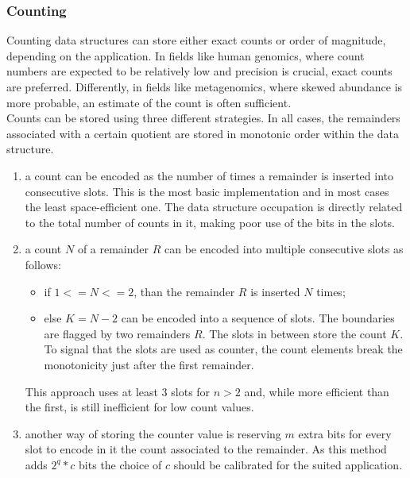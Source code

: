 \subsubsection*{Counting}
\label{sec:rsqfcount}
Counting data structures can store either exact counts or order of magnitude, depending on the application. In fields like human genomics, where count numbers are expected to be relatively low and precision is crucial, exact counts are preferred. Differently, in fields like metagenomics, where skewed abundance is more probable, an estimate of the count is often sufficient.\\
Counts can be stored using three different strategies. In all cases, the remainders associated with a certain quotient are stored in monotonic order within the data structure.
\begin{enumerate}
	\item  a count can be encoded as the number of times a remainder is inserted into consecutive slots. This is the most basic implementation and in most cases the least space-efficient one. The data structure occupation is directly related to the total number of counts in it, making poor use of the bits in the slots.
	\item a count $N$ of a remainder $R$ can be encoded into multiple consecutive slots as follows: 
	\begin{itemize}
		\item if $1 <= N <= 2$, than the remainder $R$ is inserted $N$ times;
		\item else $K = N - 2$ can be encoded into a sequence of slots. The boundaries are flagged by two remainders $R$. The slots in between store the count $K$. To signal that the slots are used as counter, the count elements break the monotonicity just after the first remainder.
	\end{itemize}
	This approach uses at least 3 slots for $n>2$ and, while more efficient than the first, is still inefficient for low count values.
	\item another way of storing the counter value is reserving $m$ extra bits for every slot to encode in it the count associated to the remainder. As this method adds $2^q * c$ bits the choice of $c$ should be calibrated for the suited application. 
\end{enumerate}

